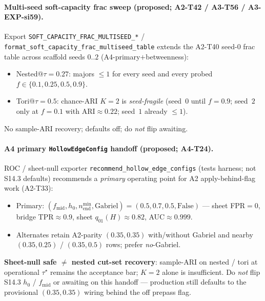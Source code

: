 \documentclass[11pt]{article}
\begin{document}
\paragraph{Multi-seed soft-capacity frac sweep (proposed; A2-T42 /
A3-T56 / A3-EXP-si59).}
Export \texttt{SOFT\_CAPACITY\_FRAC\_MULTISEED\_*} /
\texttt{format\_soft\_capacity\_frac\_multiseed\_table} extends the A2-T40
seed-$0$ frac table across scaffold seeds $0..2$ (A4-primary$+$betweenness):
\begin{itemize}[leftmargin=1.5em]
  \item Nested@$\tau{=}0.27$: majors $\le 1$ for every seed and every probed
  $f\in\{0.1,0.25,0.5,0.9\}$.
  \item Tori@$\tau{=}0.5$: chance-ARI $K{=}2$ is \emph{seed-fragile}
  (seed~$0$ until $f{=}0.9$; seed~$2$ only at $f{=}0.1$ with
  ARI$\approx 0.22$; seed~$1$ already $\le 1$).
\end{itemize}
No sample-ARI recovery; defaults off; do \emph{not} flip awaiting.

\paragraph{A4 primary \texttt{HollowEdgeConfig} handoff (proposed; A4-T24).}
ROC / sheet-null exporter
\texttt{recommend\_hollow\_edge\_configs} (tests harness; not S14.3 defaults)
recommends a \emph{primary} operating point for A2 apply-behind-flag work
(A2-T33):
\begin{itemize}[leftmargin=1.5em]
  \item Primary: $(f_{\mathrm{mid}},h_0,n_{\mathrm{end}}^{\min},\mathrm{Gabriel})
  {=}(0.5,0.7,0.5,\mathrm{False})$ --- sheet FPR${=}0$, bridge TPR$\approx 0.9$,
  sheet $q_{01}(H)\approx 0.82$, AUC$\approx 0.999$.
  \item Alternates retain A2-parity $(0.35,0.35)$ with/without Gabriel and
  nearby $(0.35,0.25)$ / $(0.35,0.5)$ rows; prefer \emph{no}-Gabriel.
\end{itemize}
\textbf{Sheet-null safe $\neq$ nested cut-set recovery}: sample-ARI on nested /
tori at operational $\tau^\star$ remains the acceptance bar; $K{=}2$ alone is
insufficient. Do \emph{not} flip S14.3 $h_0$ / $f_{\mathrm{mid}}$ or awaiting
on this handoff --- production still defaults to the provisional
$(0.35,0.35)$ wiring behind the off prepass flag.
\end{document}
